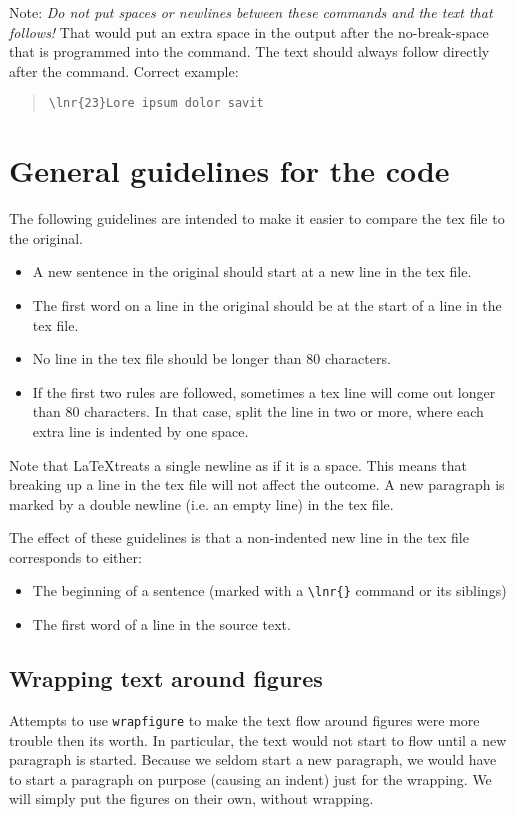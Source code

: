 \documentclass{report}
\begin{document}
Note: \emph{Do not put spaces or newlines between these commands and the
text that follows!} That would put an extra space in the output after the no-break-space that is programmed into the command. The text should always follow
directly after the command. Correct example:\begin{quote}
\verb+\lnr{23}Lore ipsum dolor savit+
\end{quote}

\section{General guidelines for the \XeLaTeX code}
The following guidelines are intended to make it easier to compare the
tex file to the original.
\begin{itemize}
\item A new sentence in the original should start at a new line in the tex file.
\item The first word on a line in the original should be at the start of a line
in the tex file.
\item No line in the tex file should be longer than 80 characters.
\item If the first two rules are followed, sometimes a tex line will come out
longer than 80 characters. In that case, split the line in two or more,
where each extra line is indented by one space.
\end{itemize}
Note that \LaTeX treats a single newline as if it is a space. This means that
breaking up a line in the tex file will not affect the outcome.
A new paragraph is marked by a double newline (i.e. an empty line) in the
tex file.

The effect of these guidelines is that a non-indented new line
in the tex file corresponds
to either:
\begin{itemize}
\item The beginning of a sentence (marked with a \verb+\lnr{}+ command or
its siblings)
\item The first word of a line in the source text.
\end{itemize}

\subsection{Wrapping text around figures}
Attempts to use \verb+wrapfigure+ to make the text flow around figures were
more trouble then its worth. In particular, the text would not start to
flow until a new paragraph is started. Because we seldom start a new paragraph,
we would have to start a paragraph on purpose (causing an indent) just for the
wrapping. We will simply put the figures on their own, without wrapping.
\end{document}
